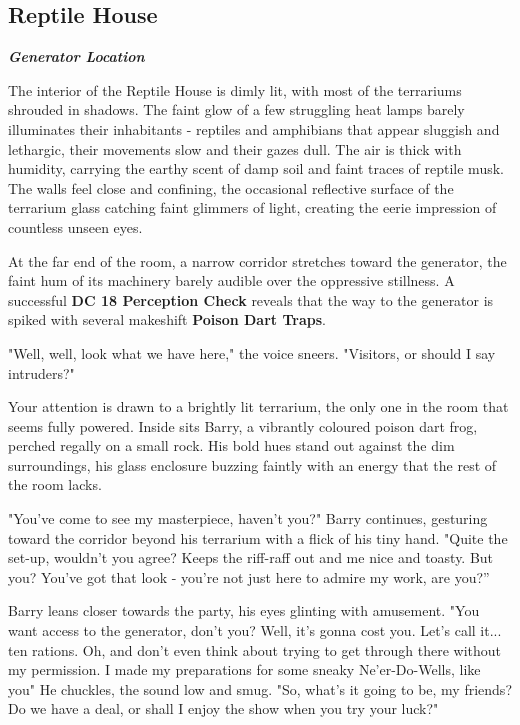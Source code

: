 \subsection*{ Reptile House}
\textbf{\textit{Generator Location}}\\
{\entryfont The interior of the Reptile House is dimly lit, with most of the terrariums shrouded in shadows. The faint glow of a few struggling heat lamps barely illuminates their inhabitants - reptiles and amphibians that appear sluggish and lethargic, their movements slow and their gazes dull. The air is thick with humidity, carrying the earthy scent of damp soil and faint traces of reptile musk. The walls feel close and confining, the occasional reflective surface of the terrarium glass catching faint glimmers of light, creating the eerie impression of countless unseen eyes.

At the far end of the room, a narrow corridor stretches toward the generator, the faint hum of its machinery barely audible over the oppressive stillness. A successful \textbf{DC 18 Perception Check} reveals that the way to the generator is spiked with several makeshift \textbf{Poison Dart Traps}.}
\begin{DndReadAloud}
	"Well, well, look what we have here," the voice sneers. "Visitors, or should I say intruders?"

	Your attention is drawn to a brightly lit terrarium, the only one in the room that seems fully powered. Inside sits Barry, a vibrantly coloured poison dart frog, perched regally on a small rock. His bold hues stand out against the dim surroundings, his glass enclosure buzzing faintly with an energy that the rest of the room lacks.

	"You've come to see my masterpiece, haven't you?" Barry continues, gesturing toward the corridor beyond his terrarium with a flick of his tiny hand. "Quite the set-up, wouldn't you agree? Keeps the riff-raff out and me nice and toasty. But you? You've got that look - you're not just here to admire my work, are you?”

	Barry leans closer towards the party, his eyes glinting with amusement. "You want access to the generator, don't you? Well, it's gonna cost you. Let's call it... ten rations. Oh, and don't even think about trying to get through there without my permission. I made my preparations for some sneaky Ne'er-Do-Wells, like you" He chuckles, the sound low and smug. "So, what's it going to be, my friends? Do we have a deal, or shall I enjoy the show when you try your luck?"
\end{DndReadAloud}
